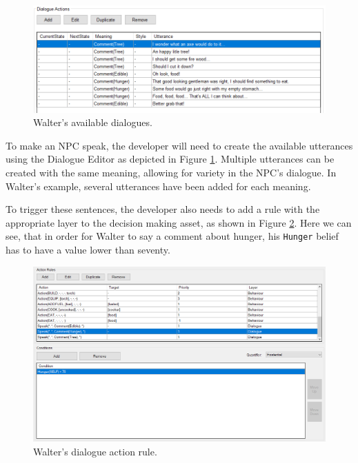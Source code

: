 \begin{figure}
  \centering
  \includegraphics[width=\textwidth]{./Images/dialogue-example}
  \caption{Walter's available dialogues.}
  \label{fig:dialogue-example}
\end{figure}

To make an \ac{NPC} speak, the developer will need to create the available utterances using the Dialogue Editor as depicted in Figure \ref{fig:dialogue-example}.
Multiple utterances can be created with the same meaning, allowing for variety in the \ac{NPC}'s dialogue.
In Walter's example, several utterances have been added for each meaning.

To trigger these sentences, the developer also needs to add a rule with the appropriate layer to the decision making asset, as shown in Figure \ref{fig:dialogue-action-example}.
Here we can see, that in order for Walter to say a comment about hunger, his \texttt{Hunger} belief has to have a value lower than seventy.

\begin{figure}
  \centering
  \includegraphics[width=\textwidth]{./Images/dialogue-action-example}
  \caption{Walter's dialogue action rule.}
  \label{fig:dialogue-action-example}
\end{figure}

